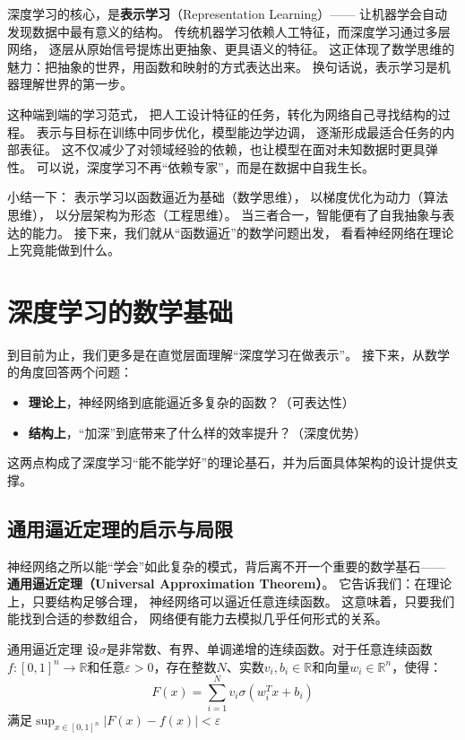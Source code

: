 深度学习的核心，是\textbf{表示学习}（Representation Learning）——  
让机器学会自动发现数据中最有意义的结构。  
传统机器学习依赖人工特征，而深度学习通过多层网络，  
逐层从原始信号提炼出更抽象、更具语义的特征。  
这正体现了数学思维的魅力：把抽象的世界，用函数和映射的方式表达出来。  
换句话说，表示学习是机器理解世界的第一步。  

这种端到端的学习范式，  
把人工设计特征的任务，转化为网络自己寻找结构的过程。  
表示与目标在训练中同步优化，模型能边学边调，  
逐渐形成最适合任务的内部表征。  
这不仅减少了对领域经验的依赖，也让模型在面对未知数据时更具弹性。  
可以说，深度学习不再“依赖专家”，而是在数据中自我生长。  

小结一下：  
表示学习以函数逼近为基础（数学思维），  
以梯度优化为动力（算法思维），  
以分层架构为形态（工程思维）。  
当三者合一，智能便有了自我抽象与表达的能力。  
接下来，我们就从“函数逼近”的数学问题出发，  
看看神经网络在理论上究竟能做到什么。

\section{深度学习的数学基础}

到目前为止，我们更多是在直觉层面理解“深度学习在做表示”。  
接下来，从数学的角度回答两个问题：  
\begin{itemize}
  \item \textbf{理论上}，神经网络到底能逼近多复杂的函数？（可表达性）  
  \item \textbf{结构上}，“加深”到底带来了什么样的效率提升？（深度优势）
\end{itemize}
这两点构成了深度学习“能不能学好”的理论基石，并为后面具体架构的设计提供支撑。

\subsection{通用逼近定理的启示与局限}

神经网络之所以能“学会”如此复杂的模式，背后离不开一个重要的数学基石——  
\textbf{通用逼近定理（Universal Approximation Theorem）}。  
它告诉我们：在理论上，只要结构足够合理，  
神经网络可以逼近任意连续函数。  
这意味着，只要我们能找到合适的参数组合，  
网络便有能力去模拟几乎任何形式的关系。

\begin{theorem}[]{通用逼近定理}
设$\sigma$是非常数、有界、单调递增的连续函数。对于任意连续函数$f: [0,1]^n \rightarrow \mathbb{R}$和任意$\varepsilon > 0$，存在整数$N$、实数$v_i, b_i \in \mathbb{R}$和向量$w_i \in \mathbb{R}^n$，使得：
$$F(x) = \sum_{i=1}^{N} v_i \sigma(w_i^T x + b_i)$$
满足$\sup_{x \in [0,1]^n} |F(x) - f(x)| < \varepsilon$
\end{theorem}

